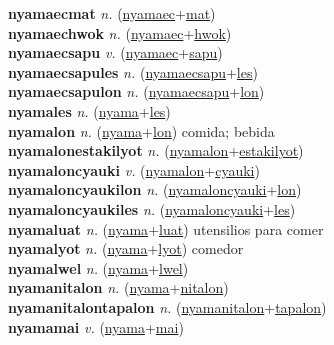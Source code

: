 \textbf{nyamaecmat} \textit{n.} (\hyperref[nyamaec]{nyamaec}+\hyperref[mat]{mat})
 \label{nyamaecmat} \\
\textbf{nyamaechwok} \textit{n.} (\hyperref[nyamaec]{nyamaec}+\hyperref[hwok]{hwok})
 \label{nyamaechwok} \\
\textbf{nyamaecsapu} \textit{v.} (\hyperref[nyamaec]{nyamaec}+\hyperref[sapu]{sapu})
 \label{nyamaecsapu} \\
\textbf{nyamaecsapules} \textit{n.} (\hyperref[nyamaecsapu]{nyamaecsapu}+\hyperref[les]{les})
 \label{nyamaecsapules} \\
\textbf{nyamaecsapulon} \textit{n.} (\hyperref[nyamaecsapu]{nyamaecsapu}+\hyperref[lon]{lon})
 \label{nyamaecsapulon} \\
\textbf{nyamales} \textit{n.} (\hyperref[nyama]{nyama}+\hyperref[les]{les})
 \label{nyamales} \\
\textbf{nyamalon} \textit{n.} (\hyperref[nyama]{nyama}+\hyperref[lon]{lon})
comida; bebida \label{nyamalon} \\
\textbf{nyamalonestakilyot} \textit{n.} (\hyperref[nyamalon]{nyamalon}+\hyperref[estakilyot]{estakilyot})
 \label{nyamalonestakilyot} \\
\textbf{nyamaloncyauki} \textit{v.} (\hyperref[nyamalon]{nyamalon}+\hyperref[cyauki]{cyauki})
 \label{nyamaloncyauki} \\
\textbf{nyamaloncyaukilon} \textit{n.} (\hyperref[nyamaloncyauki]{nyamaloncyauki}+\hyperref[lon]{lon})
 \label{nyamaloncyaukilon} \\
\textbf{nyamaloncyaukiles} \textit{n.} (\hyperref[nyamaloncyauki]{nyamaloncyauki}+\hyperref[les]{les})
 \label{nyamaloncyaukiles} \\
\textbf{nyamaluat} \textit{n.} (\hyperref[nyama]{nyama}+\hyperref[luat]{luat})
utensilios para comer \label{nyamaluat} \\
\textbf{nyamalyot} \textit{n.} (\hyperref[nyama]{nyama}+\hyperref[lyot]{lyot})
comedor \label{nyamalyot} \\
\textbf{nyamalwel} \textit{n.} (\hyperref[nyama]{nyama}+\hyperref[lwel]{lwel})
 \label{nyamalwel} \\
\textbf{nyamanitalon} \textit{n.} (\hyperref[nyama]{nyama}+\hyperref[nitalon]{nitalon})
 \label{nyamanitalon} \\
\textbf{nyamanitalontapalon} \textit{n.} (\hyperref[nyamanitalon]{nyamanitalon}+\hyperref[tapalon]{tapalon})
 \label{nyamanitalontapalon} \\
\textbf{nyamamai} \textit{v.} (\hyperref[nyama]{nyama}+\hyperref[mai]{mai})
 \label{nyamamai} \\
